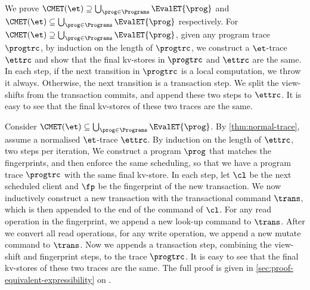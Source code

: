 \begin{proofsketch}
We prove \( \CMET(\et) \supseteq \bigcup_{\prog \in \Programs} \EvalET{\prog} \)
and \( \CMET(\et) \subseteq \bigcup_{\prog \in \Programs} \EvalET{\prog} \) respectively.
For \( \CMET(\et) \supseteq \bigcup_{\prog \in \Programs} \EvalET{\prog} \),
given any program trace \( \progtrc \), 
by induction on the length of \( \progtrc \), we construct a \( \et \)-trace \( \ettrc \)
and show that the final kv-stores in \( \progtrc \) and \( \ettrc \) are the same.
In each step, if the next transition in \( \progtrc \) is a local computation, we throw it always.
Otherwise, the next transition is a transaction step.
We split the view-shifts from the transaction commits, 
and append these two steps to \( \ettrc \).
It is easy to see that the final kv-stores of these two traces are the same.

Consider \( \CMET(\et) \subseteq \bigcup_{\prog \in \Programs} \EvalET{\prog} \).
By \cref{thm:normal-trace}, assume a normalised \( \et \)-trace \( \ettrc \).
By induction on the length of \( \ettrc \), two steps per iteration,
We construct a program \( \prog \) that matches the fingerprints,
and then enforce the same scheduling, so that we have a program trace \( \progtrc \) with the same final kv-store.
In each step, let \( \cl \) be the next scheduled client and \( \fp \) be the fingerprint of the new transaction.
We now inductively construct a new transaction with the transactional command \( \trans \), 
which is then appended to the end of the command of \( \cl \).
For any read operation in the fingerprint, we append a new look-up command to \( \trans \).
After we convert all read operations,
for any write operation, we append a new mutate command to \( \trans \).
Now we appends a transaction step, combining the view-shift and fingerprint steps, to the trace \( \progtrc \).
It is easy to see that the final kv-stores of these two traces are the same.
The full proof is given in \cref{sec:proof-equivalent-expressibility} on \pageref{sec:proof-equivalent-expressibility}.
\end{proofsketch}
